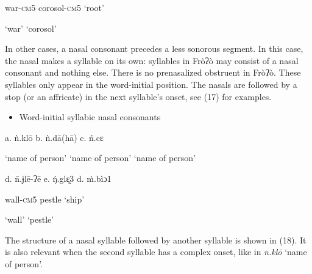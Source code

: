 \begin{styleindexi}
                          war-\textsc{cm}5                          corosol-\textsc{cm}5                          ‘root’
\end{styleindexi}

\begin{styleindexi}
                          ‘war’                               ‘corosol’           
\end{styleindexi}

In other cases, a nasal consonant precedes a less sonorous segment. In this case, the nasal makes a syllable on its own: syllables in Fròʔò may consist of a nasal consonant and nothing else. There is no prenasalized obstruent in Fròʔò. These syllables only appear in the word-initial position. The nasals are followed by a stop (or an affricate) in the next syllable’s onset, see (17) for examples.  

\begin{itemize}
\item \begin{styleindexi}
   \label{bkm:Ref470883274}Word-initial syllabic nasal consonants
\end{styleindexi}\end{itemize}
\begin{styleindexi}
        a.   ǹ.klō                       b.  ǹ.dā(hā)                     c.  ń.cɛ                           
\end{styleindexi}

\begin{styleindexi}
            ‘name of person’           ‘name of person’                ‘name of person’          
\end{styleindexi}

\begin{styleindexi}
        d.  \={n}.ɉlē-ʔē                  e.  \'{ŋ}.glɛ̰3                        d.  \`{m}.bìɔ1
\end{styleindexi}

\begin{styleindexi}
            wall-\textsc{cm}5                    pestle                              ‘ship’ 
\end{styleindexi}

\begin{styleindexi}
            ‘wall’                        ‘pestle’
\end{styleindexi}

The structure of a nasal syllable followed by another syllable is shown in (18). It is also relevant when the second syllable has a complex onset, like in \textit{n.klō} ‘name of person’.

